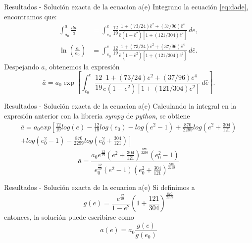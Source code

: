 \begin{frame}{Resultados - Solución exacta de la ecuacion a(e)}
    Integrano la ecuación \ref{eq:dade}, encontramos que:
\begin{align*}
    \int_{a_{0}}^{a}\frac{d\bar{a}}{\bar{a}}&=\int_{e_{0}}^{e}\frac{12}{19}\frac{1+(73/24)\bar{e}^2+(37/96)\bar{e}^4}{\bar{e}(1-\bar{e}^2)[1+(121/304)\bar{e}^2]}\,d\bar{e},\\
    \ln \left(\frac{a}{a_{0}}\right)&=\int_{e_{0}}^{e}\frac{12}{19}\frac{1+(73/24)\bar{e}^2+(37/96)\bar{e}^4}{\bar{e}(1-\bar{e}^2)[1+(121/304)\bar{e}^2]}\,d\bar{e}.
\end{align*}
Despejando $a$, obtenemos la expresión
\begin{equation}
    \bar{a}= a_{0}\exp\left[\int_{e_{0}}^{e}\frac{12}{19}\frac{1+(73/24)\bar{e}^2+(37/96)\bar{e}^4}{\bar{e}(1-\bar{e}^2)[1+(121/304)\bar{e}^2]}\,d\bar{e}\right].
    \label{eq:bara}
\end{equation}
\end{frame}
\begin{frame}{Resultados - Solución exacta de la ecuacion a(e)}
    Calculando la integral en la expresión anterior con la libreria \textit{sympy} de \textit{python}, se obtiene
\begin{eqnarray*}
        \bar{a}=a_0exp\left[\frac{12}{19}log(e)-\frac{12}{19}log(e_0)-log(e^2-1)+\frac{870}{2299}log\left(e^2+\frac{304}{121}\right)\right.\\
        \left.+log\left(e^2_0-1\right)-\frac{870}{2299}log\left(e^2_0+\frac{304}{121}\right)\right]
\end{eqnarray*}
\begin{equation}
    \bar{a}= \frac{a_0e^{\frac{12}{19}}\left(e^2+\frac{304}{121}\right)^{\frac{870}{2299}}\left(e^2_0-1\right)}{e^{\frac{12}{19}}_0\left(e^2-1\right)\left(e_0^2+\frac{304}{121}\right)^{\frac{870}{2299}}}
\end{equation}
\end{frame}
\begin{frame}{Resultados - Solución exacta de la ecuacion a(e)}
    Si definimos a 
\begin{equation}
    g(e)= \frac{e^{\frac{12}{19}}}{1-e^2} \left(1+\frac{121}{304}\right)^{\frac{870}{2299}}
    \label{eq:g(e)}
\end{equation}
entonces, la solución puede escribirse como 
\begin{equation}
    a(e)= a_0\frac{g(e)}{g(e_0)}
    \label{eq:a(e)}
\end{equation}
\end{frame}
